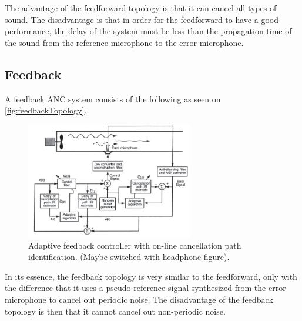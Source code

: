 The advantage of the feedforward topology is that it can cancel all types of sound. The disadvantage is that in order for the feedforward to have a good performance, the delay of the system must be less than the propagation time of the sound from the reference microphone to the error microphone.    




\subsection*{Feedback}
A feedback ANC system consists of the following as seen on \autoref{fig:feedbackTopology}.
\begin{figure}[H]
	\centering
	\includegraphics[width=0.65\textwidth]{figures/BasicSystem/feedback}
	\caption{Adaptive feedback controller with on-line cancellation path identification. (Maybe switched with headphone figure).}
	\label{fig:feedbackTopology}
\end{figure}

In its essence, the feedback topology is very similar to the feedforward, only with the difference that it uses a pseudo-reference signal synthesized from the error microphone to cancel out periodic noise. The disadvantage of the feedback topology is then that it cannot cancel out non-periodic noise.    



